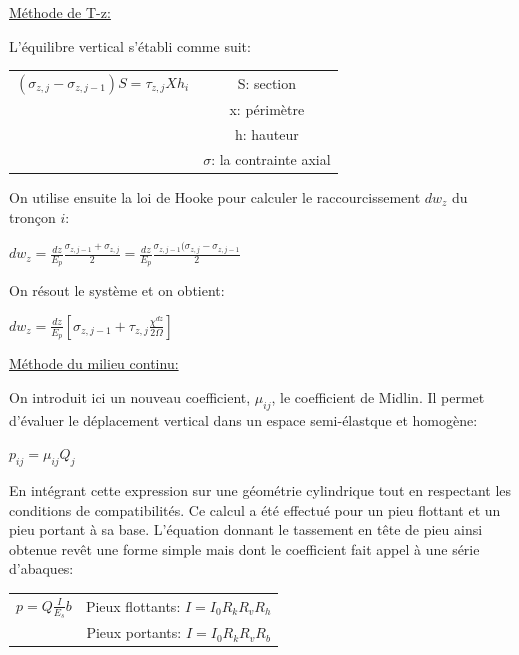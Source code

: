         \underline{Méthode de T-z:} 
        
        L'équilibre vertical s'établi comme suit: 
        
        \begin{center}
        \begin{tabular}{c|c}
            $(\sigma_{z,j} - \sigma_{z,j-1}) S = \tau_{z,j} X h_i$ \: \: \:
             &  S: section  \\
             &  x: périmètre  \\
             &  h: hauteur  \\
             &  $\sigma$: la contrainte axial  
        \end{tabular}
        \end{center}   
        
        On utilise ensuite la loi de Hooke pour calculer le raccourcissement $dw_z$ du tronçon $i$:
        
        \begin{center}
            $dw_z = \frac{dz}{E_p} \frac{\sigma_{z,j-1} + \sigma_{z,j}}{2} = \frac{dz}{E_p} \frac{\sigma_{z,j-1}(\sigma_{z,j}-\sigma_{z,j-1}}{2}$
        \end{center}
        
        On résout le système et on obtient:
        
        \begin{center}
            $dw_z = \frac{dz}{E_p} [\sigma_{z,j-1} + \tau_{z,j} \frac{\chi^{dz}}{2\Omega}]$
        \end{center} 
        
        \underline{Méthode du milieu continu:} 
        
        On introduit ici un nouveau coefficient, $\mu_{ij}$, le coefficient de Midlin. Il permet d'évaluer le déplacement vertical dans un espace semi-élastque et homogène:
        
        \begin{center}
            $p_{ij} = \mu_{ij} Q_j$
        \end{center} 
        
        En intégrant cette expression sur une géométrie cylindrique tout en respectant les conditions de compatibilités. Ce calcul a été effectué pour un pieu flottant et un pieu portant à sa base. L'équation donnant le tassement en tête de pieu ainsi obtenue revêt une forme simple mais dont le coefficient fait appel à une série d'abaques:
        
        \begin{center}
        \begin{tabular}{c|c}
             $p = Q \frac{I}{E_s} b $  \: \: \:
             &  Pieux flottants: $I = I_0 R_k R_v R_h $  \\
             &  Pieux portants: $I = I_0 R_k R_v R_b $  
        \end{tabular}
        \end{center}
        
